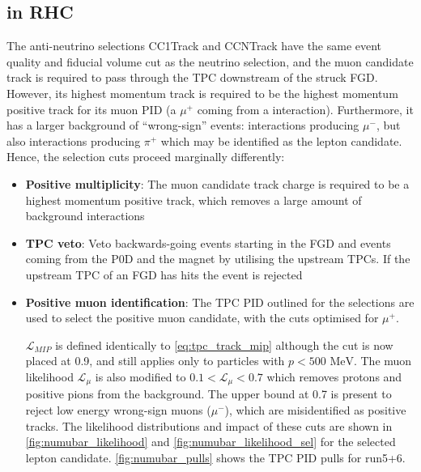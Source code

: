 \subsection{\numubar in RHC}
\label{sec:numubar_sel}
The anti-neutrino selections CC1Track and CCNTrack have the same event quality and fiducial volume cut as the neutrino selection, and the muon candidate track is required to pass through the TPC downstream of the struck FGD. However, its highest momentum track is required to be the highest momentum positive track for its muon PID (a $\mu^+$ coming from a \numubar interaction). Furthermore, it has a larger background of ``wrong-sign'' events: \numu interactions producing $\mu^-$, but also \numu interactions producing $\pi^+$ which may be identified as the lepton candidate. Hence, the selection cuts proceed marginally differently:
\begin{itemize}
	\item \textbf{Positive multiplicity}: The muon candidate track charge is required to be a highest momentum positive track, which removes a large amount of \numu background interactions
	
	\item \textbf{TPC veto}: Veto backwards-going events starting in the FGD and events coming from the P0D and the magnet by utilising the upstream TPCs. If the upstream TPC of an FGD has hits the event is rejected
	
	\item \textbf{Positive muon identification}: The TPC PID outlined for the \numu selections are used to select the positive muon candidate, with the cuts optimised for $\mu^+$. 
	
	$\mathcal{L}_{MIP}$ is defined identically to \autoref{eq:tpc_track_mip} although the cut is now placed at 0.9, and still applies only to particles with $p < 500\text{ MeV}$. The muon likelihood $\mathcal{L}_\mu$ is also modified to $0.1 < \mathcal{L}_\mu < 0.7$ which removes protons and positive pions from the \numu background. The upper bound at 0.7 is present to reject low energy wrong-sign muons ($\mu^-$), which are misidentified as positive tracks. The likelihood distributions and impact of these cuts are shown in \autoref{fig:numubar_likelihood} and \autoref{fig:numubar_likelihood_sel} for the selected lepton candidate. \autoref{fig:numubar_pulls} shows the TPC PID pulls for run5+6.
\end{itemize}

